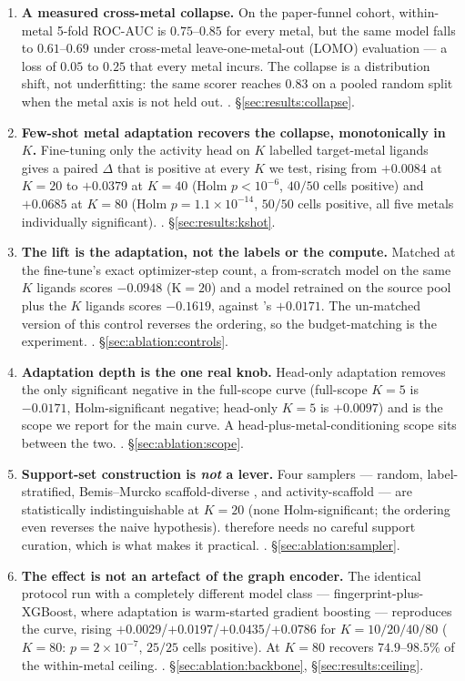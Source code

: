 \begin{enumerate}
\item \textbf{A measured cross-metal collapse.} On the paper-funnel cohort,
within-metal 5-fold ROC-AUC is $0.75$--$0.85$ for every metal, but the same
model falls to $0.61$--$0.69$ under cross-metal leave-one-metal-out (LOMO)
evaluation --- a loss of $0.05$ to $0.25$ that every metal incurs. The collapse
is a distribution shift, not underfitting: the same scorer reaches $0.83$ on a
pooled random split when the metal axis is not held out. \MEASURED.
\S\ref{sec:results:collapse}.

\item \textbf{Few-shot metal adaptation recovers the collapse, monotonically
in $K$.} Fine-tuning
only the activity head on $K$ labelled target-metal ligands gives a paired
$\Delta$ that is positive at every $K$ we test, rising from $+0.0084$ at $K{=}20$
to $+0.0379$ at $K{=}40$ (Holm $p<10^{-6}$, $40/50$ cells positive) and
$+0.0685$ at $K{=}80$ (Holm $p=1.1\times10^{-14}$, $50/50$ cells positive, all
five metals individually significant). \MEASURED. \S\ref{sec:results:kshot}.

\item \textbf{The lift is the adaptation, not the labels or the compute.}
Matched at the fine-tune's exact optimizer-step count, a from-scratch model on
the same $K$ ligands scores $-0.0948$ (K$=20$) and a model retrained on the
source pool plus the $K$ ligands scores $-0.1619$, against \fsma's $+0.0171$.
The un-matched version of this control reverses the ordering, so the
budget-matching is the experiment. \MEASURED. \S\ref{sec:ablation:controls}.

\item \textbf{Adaptation depth is the one real knob.} Head-only adaptation
removes the only significant negative in the full-scope curve (full-scope
$K{=}5$ is $-0.0171$, Holm-significant negative; head-only $K{=}5$ is $+0.0097$)
and is the scope we report for the main curve. A head-plus-metal-conditioning
scope sits between the two. \MEASURED. \S\ref{sec:ablation:scope}.

\item \textbf{Support-set construction is \emph{not} a lever.} Four samplers
--- random, label-stratified, Bemis--Murcko scaffold-diverse
\citep{bemis1996murcko}, and activity-scaffold --- are statistically
indistinguishable at $K{=}20$ (none Holm-significant; the ordering even
reverses the naive hypothesis). \fsma{} therefore needs no careful support
curation, which is what makes it practical. \MEASURED.
\S\ref{sec:ablation:sampler}.

\item \textbf{The effect is not an artefact of the graph encoder.} The identical
\fsma{} protocol run with a completely different model class ---
fingerprint-plus-XGBoost, where adaptation is warm-started gradient boosting
--- reproduces the curve, rising $+0.0029$/$+0.0197$/$+0.0435$/$+0.0786$ for
$K{=}10/20/40/80$ ($K{=}80$: $p=2\times10^{-7}$, $25/25$ cells positive). At
$K{=}80$ \fsma{} recovers $74.9$--$98.5\%$ of the within-metal ceiling.
\MEASURED. \S\ref{sec:ablation:backbone}, \S\ref{sec:results:ceiling}.
\end{enumerate}

